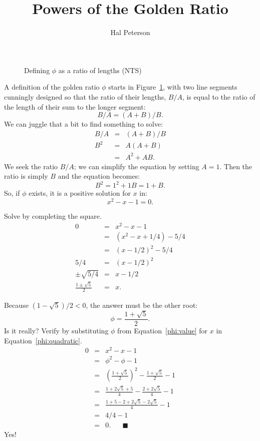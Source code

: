 \documentclass{article}
\title{Powers of the Golden Ratio}
\author{Hal Peterson}
\begin{document}
\maketitle

\begin{figure}
  \caption{Defining $\phi$ as a ratio of lengths (NTS)}
  \label{fig:phi}
\end{figure}
A definition of the golden ratio $\phi$ starts in Figure~\ref{fig:phi}, with two line segments cunningly designed so that the ratio of their lengths, $B/A$,
is equal to the ratio of the length of their sum to the longer segment:
\begin{equation}
  B/A = (A+B)/B.
  \label{phi:ratios}
\end{equation}
We can juggle that a bit to find something to solve:
\begin{eqnarray*}
  B/A & = & (A + B)/B \\
  B^2 & = & A (A + B) \\
  & = & A^2 + AB.
\end{eqnarray*}
We seek the ratio $B/A$; we can simplify the equation by setting $A=1$.
Then the ratio is simply $B$ and the equation becomes:
\begin{equation*}
  B^2 = 1^2 + 1B = 1 + B.
\end{equation*}
So, if $\phi$ exists, it is a positive solution for $x$ in:
\begin{equation}
  x^2 - x - 1 = 0.
  \label{phi:quadratic}
\end{equation}

Solve by completing the square.
\begin{eqnarray*}
  0 & = & x^2 - x - 1 \\
  & = & (x^2 - x + 1/4) - 5/4 \\
  & = & (x - 1/2)^2 - 5/4 \\
  5/4 & = & (x - 1/2)^2 \\
  \pm\sqrt{5/4} & = & x - 1/2 \\
  \frac{1 \pm \sqrt{5}}{2} & = & x.
\end{eqnarray*}

Because $(1-\sqrt{5})/2 < 0$, the answer must be the other root:
\begin{equation}
  \phi = \frac{1 + \sqrt{5}}{2}.
  \label{phi:value}
\end{equation}
Is it really?  Verify by substituting $\phi$ from Equation~\ref{phi:value} for $x$ in Equation~\ref{phi:quadratic}.
\begin{eqnarray*}
  0 & = & x^2 - x - 1 \\
  & = & \phi^2 - \phi - 1 \\
  & = & \left(\frac{1 + \sqrt{5}}{2}\right)^2 - \frac{1 + \sqrt{5}}{2} - 1 \\
  & = & \frac{1 + 2\sqrt{5} + 5}{4} - \frac{2 + 2\sqrt{5}}{4} - 1 \\
  & = & \frac{1 + 5 - 2 + 2\sqrt{5} - 2\sqrt{5}}{4} - 1 \\
  & = & 4/4 - 1 \\
  & = & 0. \hspace{20pt}\blacksquare
\end{eqnarray*}
Yes!
\end{document}
